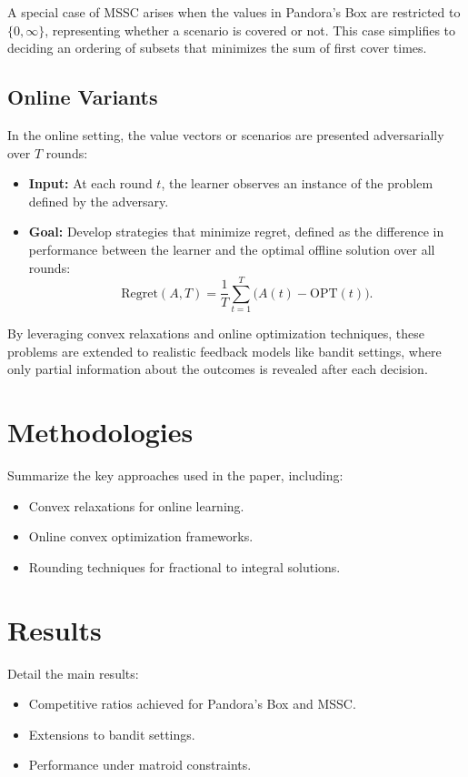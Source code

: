 \documentclass[11pt,a4paper]{article}
\begin{document}
A special case of MSSC arises when the values in Pandora’s Box are restricted to \( \{0, \infty\} \), representing whether a scenario is covered or not. This case simplifies to deciding an ordering of subsets that minimizes the sum of first cover times.

\subsection{Online Variants}
In the online setting, the value vectors or scenarios are presented adversarially over \( T \) rounds:
\begin{itemize}
    \item \textbf{Input:} At each round \( t \), the learner observes an instance of the problem defined by the adversary.
    \item \textbf{Goal:} Develop strategies that minimize regret, defined as the difference in performance between the learner and the optimal offline solution over all rounds:
    \[
    \text{Regret}(A, T) = \frac{1}{T} \sum_{t=1}^T \big(A(t) - \text{OPT}(t)\big).
    \]
\end{itemize}

By leveraging convex relaxations and online optimization techniques, these problems are extended to realistic feedback models like bandit settings, where only partial information about the outcomes is revealed after each decision.

\section{Methodologies}
Summarize the key approaches used in the paper, including:
\begin{itemize}
    \item Convex relaxations for online learning.
    \item Online convex optimization frameworks.
    \item Rounding techniques for fractional to integral solutions.
\end{itemize}

\section{Results}
Detail the main results:
\begin{itemize}
    \item Competitive ratios achieved for Pandora's Box and MSSC.
    \item Extensions to bandit settings.
    \item Performance under matroid constraints.
\end{itemize}
\end{document}
